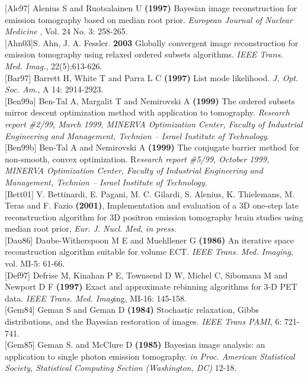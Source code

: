 \documentclass{article}
\begin{document}
{[}Ale97{]} Alenius S and Ruotsalainen U \textbf{(1997)} Bayesian image 
reconstruction for emission tomography based on median root prior. \textit{European 
Journal of Nuclear Medicine} , Vol. 24 No. 3: 258-265.\\
{[}Ahn03{]}S. Ahn, J. A. Fessler. \textbf{2003}
Globally convergent image reconstruction for emission tomography using relaxed ordered subsets algorithms. 
\textit{IEEE Trans. Med. Imag.}, 22(5):613-626. \\
{[}Bar97{]} Barrett H, White T and Parra L C \textbf{(1997)} List mode 
likelihood. \textit{J. Opt. Soc. Am.}, A 14: 2914-2923.\\
{[}Ben99a{]} Ben-Tal A, Margalit T and Nemirovski A \textbf{(1999)} The 
ordered subsets mirror descent optimization method with application 
to tomography. \textit{Research report \#2/99, March 1999, MINERVA 
Optimization Center, Faculty of Industrial Engineering and Management, 
Technion -- Israel Institute of Technology}.\\
{[}Ben99b{]} Ben-Tal A and Nemirovski A \textbf{(1999)} The conjugate 
barrier method for non-smooth, convex optimization. R\textit{esearch 
report \#5/99, October 1999, MINERVA Optimization Center, Faculty 
of Industrial Engineering and Management, Technion -- Israel Institute 
of Technology.}\\
{[}Bett01{]} V. Bettinardi, E. Pagani, M. C. Gilardi, S. Alenius, 
K. Thielemans, M. Teras and F. Fazio \textbf{(2001)}, Implementation 
and evaluation of a 3D one-step late reconstruction algorithm 
for 3D positron emission tomography brain studies using median 
root prior, \textit{Eur. J. Nucl. Med, in press.}\\
{[}Dau86{]} Daube-Witherspoon M E and Muehllener G \textbf{(1986)} An 
iterative space reconstruction algorithm suitable for volume 
ECT. \textit{IEEE Trans. Med. Imaging}, vol. MI-5: 61-66.\\
{[}Def97{]} Defrise M, Kinahan P E, Townsend D W, Michel C, Sibomana 
M and Newport D F \textbf{(1997)} Exact and approximate rebinning 
algorithms for 3-D PET data. \textit{IEEE Trans. Med. Imag}ing, MI-16: 
145-158.\\
{[}Gem84{]} Geman S and Geman D \textbf{(1984)} Stochastic relaxation, 
Gibbs distributions, and the Bayesian restoration of images. \textit{IEEE 
Trans PAMI}, 6: 721-741.\\
{[}Gem85{]} Geman S. and McClure D \textbf{(1985)} Bayesian image analysis: 
an application to single photon emission tomography. \textit{in Proc. 
American Statistical Society, Statistical Computing Section (Washington, 
DC)} 12-18.\\
\end{document}
